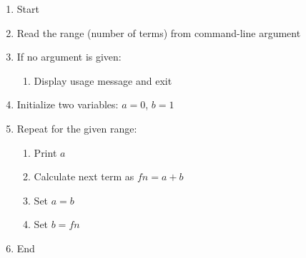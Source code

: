 \begin{enumerate}
    \item Start
    \item Read the range (number of terms) from command-line argument
    \item If no argument is given:
    \begin{enumerate}
        \item Display usage message and exit
    \end{enumerate}
    \item Initialize two variables: $a = 0$, $b = 1$
    \item Repeat for the given range:
    \begin{enumerate}
        \item Print $a$
        \item Calculate next term as $fn = a + b$
        \item Set $a = b$
        \item Set $b = fn$
    \end{enumerate}
    \item End
\end{enumerate}

